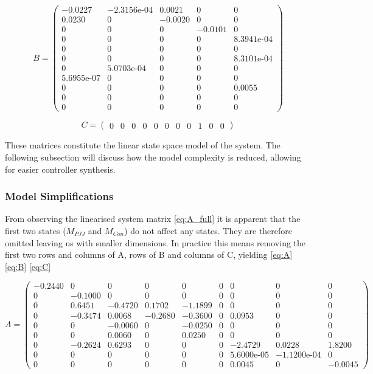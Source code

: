 \begin{equation}  \label{eq:B_full}
	B = \left(\begin{array}{ccccc}
		-0.0227 & -\text{2.3156e-04} & 0.0021 & 0 & 0\\
		0.0230 & 0 & -0.0020 & 0 & 0\\
		0 & 0 & 0 & -0.0101 & 0\\
		0 & 0 & 0 & 0 & \text{8.3941e-04}\\
		0 & 0 & 0 & 0 & 0\\
		0 & 0 & 0 & 0 & \text{8.3101e-04}\\
		0 & \text{5.0703e-04} & 0 & 0 & 0\\
		\text{5.6955e-07} & 0 & 0 & 0 & 0\\
		0 & 0 & 0 & 0 & 0.0055\\
		0 & 0 & 0 & 0 & 0\\
		0 & 0 & 0 & 0 & 0
	\end{array}\right)
\end{equation}

\begin{equation}  \label{eq:C_full}
	C = \left(\begin{array}{ccccccccccc}
		0 & 0 & 0 & 0 & 0 & 0 & 0 & 0 & 1 & 0 & 0
	\end{array}\right)
\end{equation}

These matrices constitute the linear state space model of the system. The following subsection will discuss how the model complexity is reduced, allowing for easier controller synthesis.

\subsubsection{Model Simplifications}
From observing the linearised system matrix \cref{eq:A_full} it is apparent that the first two states ($M_{PJJ}$ and $M_{Con}$) do not affect any states. They are therefore omitted leaving us with smaller dimensions. In practice this means removing the first two rows and columns of A, rows of B and columns of C, yielding \cref{eq:A} \cref{eq:B} \cref{eq:C}

\begin{equation}  \label{eq:A}
	A = \left(\begin{array}{ccccccccc}
		-0.2440 & 0 & 0 & 0 & 0 & 0 & 0 & 0 & 0\\
		0 & -0.1000 & 0 & 0 & 0 & 0 & 0 & 0 & 0\\
		0 & 0.6451 & -0.4720 & 0.1702 & -1.1899 & 0 & 0 & 0 & 0\\
		0 & -0.3474 & 0.0068 & -0.2680 & -0.3600 & 0 & 0.0953 & 0 & 0\\
		0 & 0 & -0.0060 & 0 & -0.0250 & 0 & 0 & 0 & 0\\
		0 & 0 & 0.0060 & 0 & 0.0250 & 0 & 0 & 0 & 0\\
		0 & -0.2624 & 0.6293 & 0 & 0 & 0 & -2.4729 & 0.0228 & 1.8200\\
		0 & 0 & 0 & 0 & 0 & 0 & \text{5.6000e-05} & -\text{1.1200e-04} & 0\\
		0 & 0 & 0 & 0 & 0 & 0 & 0.0045 & 0 & -0.0045
	\end{array}\right)
\end{equation}

